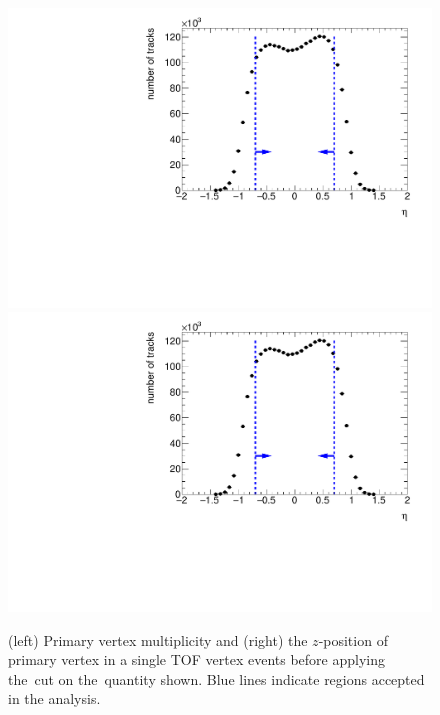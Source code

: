 \begin{figure}[h!]
	\centering
	\includegraphics[width=.49\textwidth, page=10]{chapters/chrgSTAR/img/selection/SDT.pdf}
	\includegraphics[width=.49\textwidth, page=5]{chapters/chrgSTAR/img/selection/SDT.pdf}
	\caption{(left) Primary vertex multiplicity  and  (right) the $z$-position of primary vertex in a single TOF vertex events before applying  the~cut on the~quantity shown. Blue lines indicate regions accepted in the analysis.}
	\label{fig:vertexSTAR}
\end{figure}

\FloatBarrier